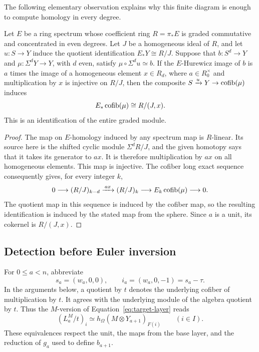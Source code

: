 The following elementary observation explains why this finite diagram
is enough to compute homology in every degree.

\begin{lemma}\label{real:cofiber-quotient}
Let \(E\) be a ring spectrum whose coefficient ring \(R=\pi_*E\)
is graded commutative and concentrated in even degrees. Let \(J\)
be a homogeneous ideal of \(R\), and let \(u:S\to Y\) induce
the quotient identification \(E_*Y\cong R/J\). Suppose that
\(b:S^d\to Y\) and \(\mu:\Sigma^dY\to Y\), with \(d\) even, satisfy
\(\mu\circ\Sigma^du\simeq b\).  If the \(E\)-Hurewicz image
of \(b\) is \(a\) times the image of a homogeneous element
\(x\in R_d\), where \(a\in R_0^\times\) and multiplication
by \(x\) is injective on \(R/J\), then the
composite \(S\xrightarrow{u}Y\to\operatorname{cofib}(\mu)\) induces
\[
 E_*\operatorname{cofib}(\mu)\cong R/(J,x).
\]
This is an identification of the entire graded module.
\end{lemma}

\begin{proof}
The map on \(E\)-homology induced by any spectrum map is
\(R\)-linear.  Its source here is the shifted cyclic module
\(\Sigma^dR/J\), and the given homotopy says that it takes its
generator to \(a x\).  It is therefore multiplication by \(a x\)
on all homogeneous elements.  This map is injective.  The cofiber
long exact sequence consequently gives, for every integer \(k\),
\[
 0\longrightarrow (R/J)_{k-d}
 \xrightarrow{\,a x\,}(R/J)_k
 \longrightarrow E_k\operatorname{cofib}(\mu)\longrightarrow 0.
\]
The quotient map in this sequence is induced by the cofiber map, so
the resulting identification is induced by the stated map from the
sphere.  Since \(a\) is a unit, its cokernel is \(R/(J,x)\).
\end{proof}

\subsection{Detection before Euler inversion}

For \(0\leq a<n\), abbreviate
\[
 s_a=(w_a,0,0),\qquad i_a=(w_a,0,-1)=s_a-\tau.
\]
In the arguments below, a quotient by \(t\) denotes the underlying
cofiber of multiplication by \(t\).  It agrees with the underlying
module of the algebra quotient by \(t\).  Thus the \(M\)-version
of Equation~\eqref{eq:target-layer} reads
\begin{equation}
 (L_a^M/t)_i\simeq
 h_\Omega(M\otimes Y_{a+1})_{F(i)}
 \qquad(i\in I).
 \label{real:target-layer-M}
\end{equation}
These equivalences respect the unit, the maps from the base layer,
and the reduction of \(g_a\) used to define \(b_{a+1}\).

